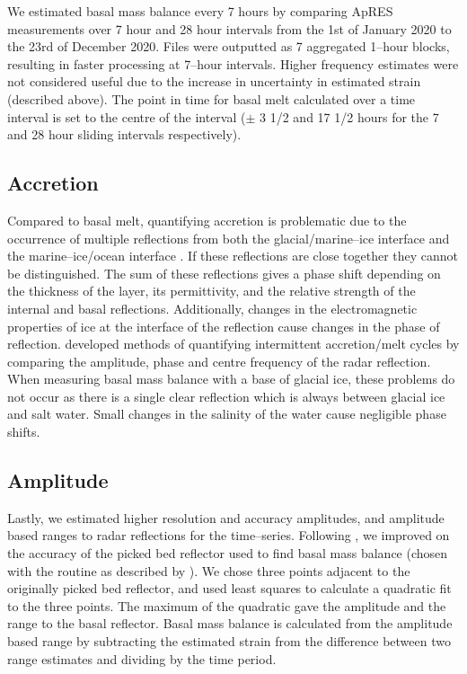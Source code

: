 We estimated basal mass balance every 7 hours by comparing ApRES measurements over 7 hour and 28 hour intervals from the 1st of January 2020 to the 23rd of December 2020. Files were outputted as 7 aggregated 1--hour blocks, resulting in faster processing at 7--hour intervals. Higher frequency estimates were not considered useful due to the increase in uncertainty in estimated strain  (described above).    The point in time for basal melt calculated over a time interval is set to the centre of the interval ($\pm$ 3 1/2 and 17 1/2 hours for the 7 and 28 hour sliding intervals respectively).

\subsection{Accretion}
Compared to basal melt, quantifying accretion is problematic due to the occurrence of multiple reflections from both the glacial/marine--ice interface and the marine--ice/ocean interface \citep{vavnkova2020observations}.  
If these reflections are close together they cannot be distinguished. The sum of these reflections gives a phase shift depending on the thickness of the layer, its permittivity, and the relative strength of the internal and basal reflections.  
Additionally, changes in the electromagnetic properties of ice at the interface of the reflection cause changes in the phase of reflection. \cite{vavnkova2021nature} developed methods of quantifying intermittent accretion/melt cycles by comparing the amplitude, phase and centre frequency of the radar reflection.
When measuring basal mass balance with a base of glacial ice, these problems do not occur as there is a single clear reflection which is always between glacial ice and salt water. Small changes in the salinity of the water cause negligible phase shifts. 

\subsection{Amplitude}

Lastly, we estimated higher resolution and accuracy amplitudes, and amplitude based ranges to radar reflections for the time--series.
Following \cite{vavnkova2021nature}, we improved on the accuracy of the picked bed reflector used to find basal mass balance (chosen with the routine as described by \citep{stewart2018ice}). We chose three points adjacent to the originally picked bed reflector, and used least squares to calculate a quadratic fit to the three points. The maximum of the quadratic gave the amplitude and the range to the basal reflector.
Basal mass balance is calculated from the amplitude based range by subtracting the estimated strain from the difference between two range estimates and dividing by the time period.

